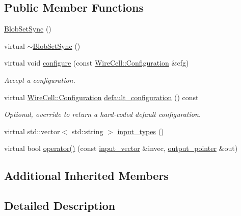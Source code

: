 \subsection*{Public Member Functions}
\begin{DoxyCompactItemize}
\item 
\hyperlink{class_wire_cell_1_1_img_1_1_blob_set_sync_a90b6c3f850e815cee1c088366bac6f1c}{Blob\+Set\+Sync} ()
\item 
virtual \hyperlink{class_wire_cell_1_1_img_1_1_blob_set_sync_ac158ca6a6e0d2b5f78d1c229c786ba45}{$\sim$\+Blob\+Set\+Sync} ()
\item 
virtual void \hyperlink{class_wire_cell_1_1_img_1_1_blob_set_sync_aebc415a71b73c7716d1e138514592699}{configure} (const \hyperlink{namespace_wire_cell_a9f705541fc1d46c608b3d32c182333ee}{Wire\+Cell\+::\+Configuration} \&cfg)
\begin{DoxyCompactList}\small\item\em Accept a configuration. \end{DoxyCompactList}\item 
virtual \hyperlink{namespace_wire_cell_a9f705541fc1d46c608b3d32c182333ee}{Wire\+Cell\+::\+Configuration} \hyperlink{class_wire_cell_1_1_img_1_1_blob_set_sync_a2a1fa199a9e012d6bee50061f2381609}{default\+\_\+configuration} () const
\begin{DoxyCompactList}\small\item\em Optional, override to return a hard-\/coded default configuration. \end{DoxyCompactList}\item 
virtual std\+::vector$<$ std\+::string $>$ \hyperlink{class_wire_cell_1_1_img_1_1_blob_set_sync_aa32d9014596aec6bcbdcd8ed027a95ad}{input\+\_\+types} ()
\item 
virtual bool \hyperlink{class_wire_cell_1_1_img_1_1_blob_set_sync_a536fca2a18e1bf4b44e5aad6f8b39ded}{operator()} (const \hyperlink{class_wire_cell_1_1_i_fanin_node_aec26233b8b7756c5a42280a5db47ffda}{input\+\_\+vector} \&invec, \hyperlink{class_wire_cell_1_1_i_fanin_node_a748d9cd1916dda1cb12c3376b229f906}{output\+\_\+pointer} \&out)
\end{DoxyCompactItemize}
\subsection*{Additional Inherited Members}


\subsection{Detailed Description}


